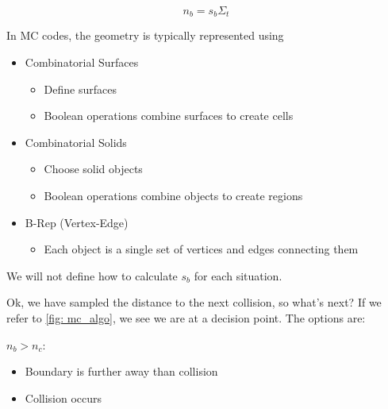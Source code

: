 \documentclass[12pt]{article}
\begin{document}
\begin{equation*}
  n_b = s_b \Sigma_t
\end{equation*}

In MC codes, the geometry is typically represented using 

\begin{itemize}
  \item Combinatorial Surfaces
  \begin{itemize}
    \item Define surfaces
    \item Boolean operations combine surfaces to create cells
  \end{itemize}
  \vspace*{1 em}
  \item Combinatorial Solids
  \begin{itemize}
    \item Choose solid objects
    \item Boolean operations combine objects to create regions
  \end{itemize}
  \vspace*{1 em}
  \item B-Rep (Vertex-Edge)
  \begin{itemize}
    \item Each object is a single set of vertices and edges connecting them
  \end{itemize}
\end{itemize}

We will not define how to calculate $s_b$ for each situation.

Ok, we have sampled the distance to the next collision, so what's next?
If we refer to \autoref{fig: mc_algo}, we see we are at a decision point.
The options are:

\underline{$n_b > n_c$}:
\begin{itemize}
  \item Boundary is further away than collision
  \item Collision occurs
\end{itemize}
  \vspace*{0.5 em}
\end{document}
